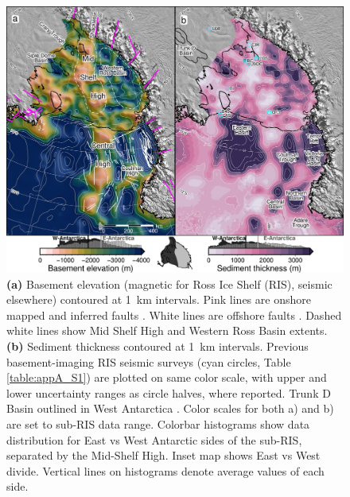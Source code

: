 \begin{figure}
    \includegraphics[width=\textwidth]{figures/chp2/Fig3_basement_sediment.jpg}
    \caption[Basement elevation and sediment thickness]{\textbf{(a)} Basement elevation (magnetic for Ross Ice Shelf (RIS), seismic elsewhere) contoured at 1~km intervals. Pink lines are onshore mapped and inferred faults \citep{goodgegeological2020, siddowaytectonics2008, ferraccioliaeromagnetic2002a}. White lines are offshore faults \citep{salvinicenozoic1997, luyendykstructural2001, chiappiniregional2002, saulineogene2021}. Dashed white lines show Mid Shelf High and Western Ross Basin extents. \textbf{(b)} Sediment thickness contoured at 1~km intervals. Previous basement-imaging RIS seismic surveys (cyan circles, Table \ref{table:appA_S1}) are plotted on same color scale, with upper and lower uncertainty ranges as circle halves, where reported. Trunk D Basin outlined in West Antarctica \citep{bellidentifying2006}. Color scales for both a) and b) are set to sub-RIS data range. Colorbar histograms show data distribution for East vs West Antarctic sides of the sub-RIS, separated by the Mid-Shelf High. Inset map shows East vs West divide. Vertical lines on histograms denote average values of each side.}
    \label{fig:chp2_Basement_sediment}
\end{figure}

